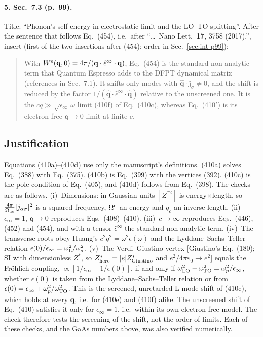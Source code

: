 \documentclass[11pt]{article}
\begin{document}
\paragraph{5. Sec.~7.3 (p.~99).}
Title: ``Phonon's self-energy in electrostatic limit and the LO--TO splitting''. After the sentence that
follows Eq.~(454), i.e.\ after ``\ldots\ Nano Lett.\ \textbf{17}, 3758 (2017).'', insert (first of the two
insertions after (454); order in Sec.~\ref{sec:int-p99}):
\begin{quote}
With $W^{\rm e}(\mathbf q,0)=4\pi/(\mathbf q\cdot\hat\epsilon^\infty\cdot\mathbf q)$, Eq.~(454) is the standard
non-analytic term that Quantum Espresso adds to the DFPT dynamical matrix (references in Sec.~7.1). It
shifts only modes with $\hat{\mathbf q}\cdot\mathbf j_\sigma\neq0$, and the shift is reduced by the factor
$1/(\hat{\mathbf q}\cdot\hat\epsilon^\infty\cdot\hat{\mathbf q})$ relative to the unscreened one. It is the
$cq\gg\sqrt{\epsilon_\infty}\,\omega$ limit (410f) of Eq.~(410c), whereas Eq.~(410$'$) is its electron-free
$\mathbf q\to0$ limit at finite $c$.
\end{quote}

\subsection{Justification}
Equations (410a)--(410d) use only the manuscript's definitions. (410a) solves Eq.~(388) with Eq.~(375).
(410b) is Eq.~(399) with the vertices (392). (410c) is the pole condition of Eq.~(405), and (410d)
follows from Eq.~(398). The checks are as follows.
(i)~Dimensions: in Gaussian units $[Z^{*2}]$ is energy$\times$length, so
$\frac{4\pi}{\Omega_{\rm uc}}|j_{\alpha\sigma}|^2$ is a squared frequency, $\Omega^{\rm e}$ an energy and $q_c$ an
inverse length.
(ii)~$\epsilon_\infty=1$, $\mathbf q\to0$ reproduces Eqs.~(408)--(410).
(iii)~$c\to\infty$ reproduces Eqs.~(446), (452) and (454), and with a tensor $\hat\epsilon^\infty$ the
standard non-analytic term.
(iv)~The transverse roots obey Huang's $c^2q^2=\omega^2\epsilon(\omega)$ and the Lyddane--Sachs--Teller
relation $\epsilon(0)/\epsilon_\infty=\omega_{\rm L}^2/\omega_\sigma^2$.
(v)~The Verdi--Giustino vertex [Giustino's Eq.~(180); SI with dimensionless $Z^*$, so
$Z^*_{\rm here}=|e|Z^*_{\rm Giustino}$ and $e^2/4\pi\varepsilon_0\to e^2$] equals the Fr\"ohlich coupling,
$\propto[1/\epsilon_\infty-1/\epsilon(0)]$, if and only if $\omega_{\rm LO}^2-\omega_{\rm TO}^2=\omega_p^2/
\epsilon_\infty$, whether $\epsilon(0)$ is taken from the Lyddane--Sachs--Teller relation or from
$\epsilon(0)=\epsilon_\infty+\omega_p^2/\omega_{\rm TO}^2$. This is the screened, unretarded L-mode shift of
(410c), which holds at every $\mathbf q$, i.e.\ for (410e) and (410f) alike. The unscreened shift of
Eq.~(410) satisfies it only for $\epsilon_\infty=1$, i.e.\ within its own electron-free model. The check
therefore tests the screening of the shift, not the order of limits.
Each of these checks, and the GaAs numbers above, was also verified numerically.
\end{document}
